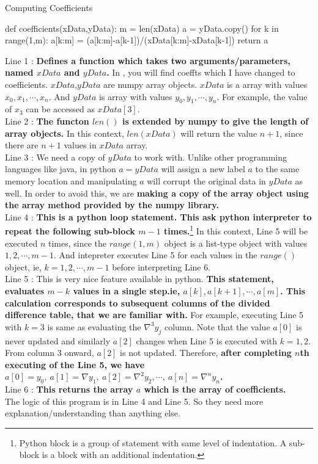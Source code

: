 \begin{program}Computing Coefficients
	\begin{python}
		def coefficients(xData,yData):
			m = len(xData)
			a = yData.copy()
			for k in range(1,m):
				a[k:m] = (a[k:m]-a[k-1])/(xData[k:m]-xData[k-1])
			return a
	\end{python}
	Line 1 : \textbf{Defines a function which takes two arguments/parameters, named $xData$ and $yData$.} In \cite[3.2]{kiusalaas}, you will find coeffts which I have changed to coefficients. $xData$,$yData$ are numpy array objects. $xData$ is a array with values $x_0,x_1,\cdots,x_n$. And $yData$ is array with values $y_0,y_1,\cdots,y_n$. For example, the value of $x_3$ can be accessed as $xData[3]$.\\
	
	Line 2 : \textbf{The functon $len()$ is extended by numpy to give the length of array objects.} In this context, $len(xData)$ will return the value $n+1$, since there are $n+1$ values in $xData$ array.\\

	Line 3 : We need a copy of $yData$ to work with. Unlike other programming languages like java, in python $a = yData$ will assign a new label $a$ to the same memory location and manipulating $a$ will corrupt the original data in $yData$ as well. In order to avoid this, we are \textbf{making a copy of the array object using the array method provided by the numpy library.}\\

	Line 4 : \textbf{This is a python loop statement. This ask python interpreter to repeat the following sub-block $m-1$ times.}\footnote{Python block is a group of statement with same level of indentation. A sub-block is a block with an additional indentation.} In this context, Line 5 will be executed $n$ times, since the $range(1,m)$ object is a list-type object with values $1,2,\cdots,m-1$. And intepreter executes Line 5 for each values in the $range()$ object, ie, $k=1,2,\cdots, m-1$ before interpreting Line 6.\\

	Line 5 : This is very nice feature available in python. \textbf{This statement, evaluates $m-k$ values in a single step.ie, $a[k],a[k+1],\cdots,a[m]$. This calculation corresponds to subsequent columns of the divided difference table, that we are familiar with.} For example, executing Line 5 with $k=3$ is same as evaluating the $\nabla^3y_j$ column. Note that the value $a[0]$ is never updated and similarly $a[2]$ changes when Line 5 is executed with $k=1,2$. From column 3 onward, $a[2]$ is not updated. Therefore, \textbf{after completing $n$th executing of the Line 5, we have $a[0] = y_0,\ a[1]=\nabla y_1,\ a[2]=\nabla^2 y_2,\cdots,\ a[n]=\nabla^n y_n$.}\\

	Line 6 : \textbf{This returns the array $a$ which is the array of coefficients.}\\

	The logic of this program is in Line 4 and Line 5. So they need more explanation/understanding than anything else.
\end{program}

